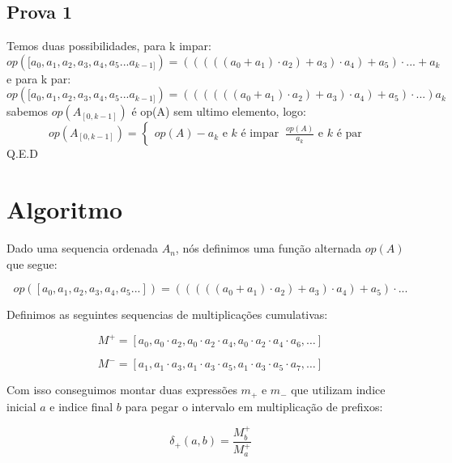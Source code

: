 \documentclass{article}
\begin{document}
\subsection{Prova 1}
Temos duas possibilidades, para k impar:
\begin{equation}
op([a_0,a_1,a_2,a_3,a_4,a_5... a_{k-1]})= (((((a_0+a_1)\cdot a_2)+a_3)\cdot a_4)+a_5)\cdot ... + a_{k}
\end{equation}
e para k par:
\begin{equation}
op([a_0,a_1,a_2,a_3,a_4,a_5... a_{k-1]})= ((((((a_0+a_1)\cdot a_2)+a_3)\cdot a_4)+a_5)\cdot ...) a_{k}
\end{equation}
sabemos $op(A_{[0,k-1]})$ é op(A) sem ultimo elemento, logo:
\begin{equation}
op(A_{[0,k-1]})= \begin{cases}
op(A) - a_k \text{ e } k \text{ é impar } \
\frac{op(A)}{a_k} \text{ e } k \text{ é par } \
\end{cases}
\end{equation}
Q.E.D

\section{Algoritmo}

Dado uma sequencia ordenada $A_n$, nós definimos uma função alternada $op(A)$ que segue:

\begin{equation*}
op([a_0,a_1,a_2,a_3,a_4,a_5...])= (((((a_0+a_1)\cdot a_2)+a_3)\cdot a_4)+a_5)\cdot ...
\end{equation*}

Definimos as seguintes sequencias de multiplicações cumulativas:

\begin{equation*}
M^{+} = [ a_0, a_0 \cdot a_2, a_0 \cdot a_2 \cdot a_4, a_0 \cdot a_2 \cdot a_4 \cdot a_6, \dots]
\end{equation*}

\begin{equation*}
M^{-} = [ a_1, a_1 \cdot a_3, a_1 \cdot a_3 \cdot a_5, a_1 \cdot a_3 \cdot a_5 \cdot a_7, \dots]
\end{equation*}

Com isso conseguimos montar duas expressões $m_{+}$ e $m_{-}$ que utilizam indice inicial $a$ e indice final $b$ para pegar o intervalo em multiplicação de prefixos:

\begin{equation*}
\delta_{+}(a, b) = \frac{M_{b}^{+}}{M_{a}^{+}}
\end{equation*}
\end{document}
